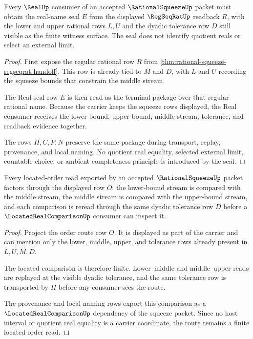 \begin{theorem}
\label{thm:rational-squeeze-real-seal}
Every $\RealUp$ consumer of an accepted $\RationalSqueezeUp$ packet must obtain the real-name seal $E$ from the displayed $\RegSeqRatUp$ readback $R$, with the lower and upper rational rows $L,U$ and the dyadic tolerance row $D$ still visible as the finite witness surface. The seal does not identify quotient reals or select an external limit.
\end{theorem}
\begin{proof}
First expose the regular rational row $R$ from \autoref{thm:rational-squeeze-regseqrat-handoff}. This row is already tied to $M$ and $D$, with $L$ and $U$ recording the squeeze bounds that constrain the middle stream.

The Real seal row $E$ is then read as the terminal package over that regular rational name. Because the carrier keeps the squeeze rows displayed, the Real consumer receives the lower bound, upper bound, middle stream, tolerance, and readback evidence together.

The rows $H,C,P,N$ preserve the same package during transport, replay, provenance, and local naming. No quotient real equality, selected external limit, countable choice, or ambient completeness principle is introduced by the seal.
\end{proof}

\begin{theorem}
\label{thm:rational-squeeze-located-order-route}
Every located-order read exported by an accepted $\RationalSqueezeUp$ packet factors through the displayed row $O$: the lower-bound stream is compared with the middle stream, the middle stream is compared with the upper-bound stream, and each comparison is reread through the same dyadic tolerance row $D$ before a $\LocatedRealComparisonUp$ consumer can inspect it.
\end{theorem}
\begin{proof}
Project the order route row $O$. It is displayed as part of the carrier and can mention only the lower, middle, upper, and tolerance rows already present in $L,U,M,D$.

The located comparison is therefore finite. Lower--middle and middle--upper reads are replayed at the visible dyadic tolerance, and the same tolerance row is transported by $H$ before any consumer sees the route.

The provenance and local naming rows export this comparison as a $\LocatedRealComparisonUp$ dependency of the squeeze packet. Since no host interval or quotient real equality is a carrier coordinate, the route remains a finite located-order read.
\end{proof}


